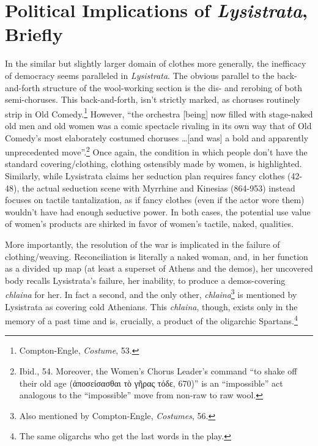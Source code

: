 \documentclass[12pt]{article}
\begin{document}
\section{Political Implications of \textit{Lysistrata}, Briefly}

In the similar but slightly larger domain of clothes more generally, the inefficacy of democracy seems paralleled in \textit{Lysistrata}. The obvious parallel to the back-and-forth structure of the wool-working section is the dis- and rerobing of both semi-choruses. This back-and-forth, isn't strictly marked, as choruses routinely strip in Old Comedy.\footnote{Compton-Engle, \textit{Costume}, 53.} However, ``the orchestra [being] now filled with stage-naked old men and old women was a comic spectacle rivaling in its own way that of Old Comedy's most elaborately costumed choruses \dots  [and was] a bold and apparently unprecedented move''.\footnote{Ibid., 54. Moreover, the Women's Chorus Leader's command ``to shake off their old age (ἀποσείσασθαι τὸ γῆρας τόδε, 670)'' is an ``impossible'' act analogous to the ``impossible'' move from non-raw to raw wool.} Once again, the condition in which people don't have the standard covering/clothing, clothing ostensibly made by women, is highlighted. Similarly, while Lysistrata claims her seduction plan requires fancy clothes (42-48), the actual seduction scene with Myrrhine and Kinesias (864-953) instead focuses on tactile tantalization, as if fancy clothes (even if the actor wore them) wouldn't have had enough seductive power. In both cases, the potential use value of women's products are shirked in favor of women's tactile, naked, qualities.

More importantly, the resolution of the war is implicated in the failure of clothing/weaving. Reconciliation is literally a naked woman, and, in her function as a divided up map (at least a superset of Athens and the demos), her uncovered body recalls Lysistrata's failure, her inability, to produce a demos-covering \textit{chlaina} for her. In fact a second, and the only other, \textit{chlaina}\footnote{Also mentioned by Compton-Engle, \textit{Costumes}, 56.} is mentioned by Lysistrata as covering cold Athenians. This \textit{chlaina}, though, exists only in the memory of a past time and is, crucially, a product of the oligarchic Spartans.\footnote{The same oligarchs who get the last words in the play.}
\end{document}
